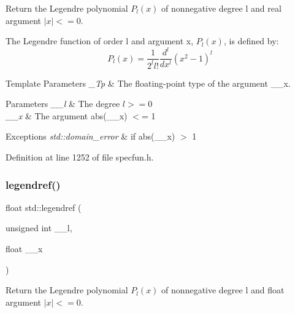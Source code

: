 Return the Legendre polynomial $ P_l(x) $ of nonnegative degree {\ttfamily l} and real argument $ |x| <= 0 $.

The Legendre function of order {\ttfamily l} and argument {\ttfamily x}, $ P_l(x) $, is defined by\+: \[ P_l(x) = \frac{1}{2^l l!}\frac{d^l}{dx^l}(x^2 - 1)^{l} \]


\begin{DoxyTemplParams}{Template Parameters}
{\em \+\_\+\+Tp} & The floating-\/point type of the argument {\ttfamily \+\_\+\+\_\+x}. \\
\hline
\end{DoxyTemplParams}

\begin{DoxyParams}{Parameters}
{\em \+\_\+\+\_\+l} & The degree $ l >= 0 $ \\
\hline
{\em \+\_\+\+\_\+x} & The argument {\ttfamily abs(\+\_\+\+\_\+x)} $<$= 1 \\
\hline
\end{DoxyParams}

\begin{DoxyExceptions}{Exceptions}
{\em std\+::domain\+\_\+error} & if {\ttfamily abs(\+\_\+\+\_\+x)} $>$ 1 \\
\hline
\end{DoxyExceptions}


Definition at line 1252 of file specfun.\+h.

\mbox{\label{group__mathsf__std_gaed94e3c664c99f5204da75be75aeac21}} 
\subsubsection{\texorpdfstring{legendref()}{legendref()}}
{\footnotesize\ttfamily float std\+::legendref (\begin{DoxyParamCaption}\item[{unsigned int}]{\+\_\+\+\_\+l,  }\item[{float}]{\+\_\+\+\_\+x }\end{DoxyParamCaption})\hspace{0.3cm}{\ttfamily [inline]}}

Return the Legendre polynomial $ P_l(x) $ of nonnegative degree {\ttfamily l} and {\ttfamily float} argument $ |x| <= 0 $.

